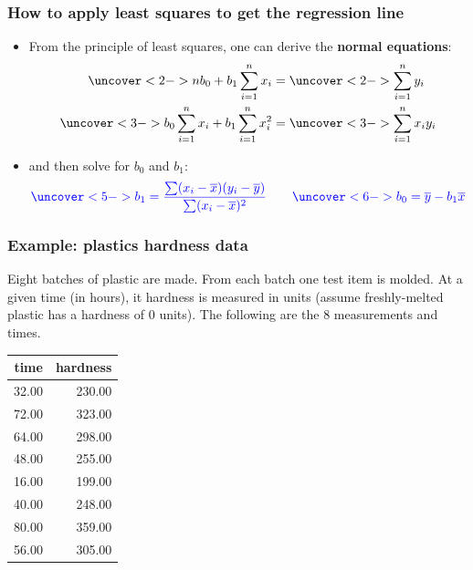\documentclass[handout]{beamer}
\providecommand{\ov}[1]{\overline{#1}}
\numberwithin{equation}{section}
\begin{document}
\begin{frame}
\frametitle{How to apply least squares to get the regression line}
\begin{itemize}
\pause \item From the principle of least squares, one can derive the {\bf normal equations}:
\begin{align*}
\uncover<2->{n b_0 + b_1 \sum_{i = 1}^n x_i} &= \uncover<2->{\sum_{i = 1}^n y_i} \\
\uncover<3->{b_0 \sum_{i = 1}^n x_i + b_1 \sum_{i = 1}^n x_i^2} &= \uncover<3->{\sum_{i = 1}^n x_i y_i}
\end{align*}
\pause \pause \item and then solve for $b_0$ and $b_1$:
\begin{align*}
\color{blue} \uncover<5->{b_1 = \frac{\sum(x_i - \ov{x})(y_i - \ov{y})}{\sum(x_i - \ov{x})^2}} \qquad \uncover<6->{b_0 = \ov{y}- b_1 \ov{x}}
\end{align*}
\end{itemize}
\end{frame}

\begin{frame}
\frametitle{Example: plastics hardness data} \small
Eight batches of plastic are made. From each batch one test item is molded. At a given time (in hours), it hardness is measured in units (assume freshly-melted plastic has a hardness of 0 units). The following are the 8 measurements and times.

\begin{minipage}[b]{0.47\linewidth}
\begin{table}[ht]
\centering
\begin{tabular}{rr}
 time & hardness \\ 
  \hline
32.00 & 230.00 \\ 
  72.00 & 323.00 \\ 
  64.00 & 298.00 \\ 
  48.00 & 255.00 \\ 
  16.00 & 199.00 \\ 
  40.00 & 248.00 \\ 
  80.00 & 359.00 \\ 
  56.00 & 305.00 \\ 
  \end{tabular}
\end{table}\end{minipage}
\begin{minipage}[b]{0.47\linewidth}
\end{minipage}

\end{frame}
\end{document}
